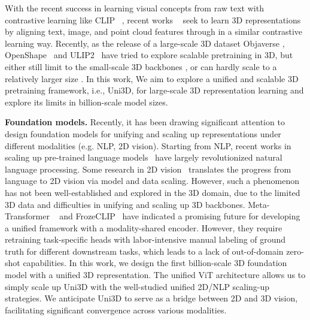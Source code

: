 \documentclass{article} \usepackage{iclr2024_conference,times}
\def\Ours{Uni3D\xspace}
\begin{document}
With the recent success in learning visual concepts from raw text with contrastive learning like CLIP ~\citep{radford2021learning,jia2021scaling,li2022grounded,ramesh2022hierarchical,gregoromichelaki2022language},
recent works ~\citep{ liu2023openshape, qi2023contrast,xue2023ulip,hegde2023clip, lei2023vit} seek to learn 3D representations by aligning text, image, and point cloud features through in a similar contrastive learning way. Recently, as the release of a large-scale 3D dataset Objaverse \citep{deitke2023objaverse}, OpenShape~\citep{ liu2023openshape} and ULIP2~\citep{xue2023ulip2} have tried to explore scalable pretraining in 3D, but either still limit to the small-scale 3D backbones \citep{xue2023ulip2}, or can hardly scale to a relatively larger size \citep{liu2023openshape}. In this work, We aim to explore a unified and scalable 3D pretraining framework, i.e., \Ours, for large-scale 3D representation learning and explore its limits in billion-scale model sizes.


\textbf{Foundation models.}
Recently, it has been drawing significant attention to design foundation models for unifying and scaling up representations under different modalities (e.g. NLP, 2D vision). Starting from NLP, recent works in scaling up pre-trained language models~\citep{brown2020language, liu2019roberta, raffel2020exploring} have largely revolutionized natural language processing.
Some research in 2D vision~\citep{radford2021learning, dosovitskiy2020image, bao2021beit, he2022masked, fang2023eva} translates the progress from language to 2D vision via model and data scaling.  However, such a phenomenon has not been well-established and explored in the 3D domain, due to the limited 3D data and difficulties in unifying and scaling up 3D backbones. 
Meta-Transformer ~\citep{zhang2023metatransformer} and FrozeCLIP~\citep{huang2022frozen} have indicated a promising future for developing a unified framework with a modality-shared encoder. However, they require retraining task-specific heads with labor-intensive manual labeling of ground truth for different downstream tasks, which leads to a lack of out-of-domain zero-shot capabilities. 
In this work, we design the first billion-scale 3D foundation model with a unified 3D representation. 
The unified ViT architecture allows us to simply scale up \Ours with the well-studied unified 2D/NLP scaling-up strategies. 
We anticipate \Ours to serve as a bridge between 2D and 3D vision, facilitating significant convergence across various modalities.
\end{document}
